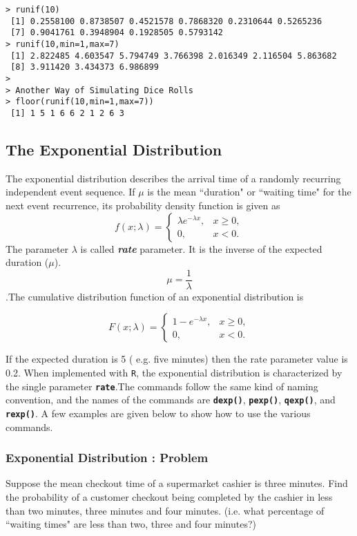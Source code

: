 \begin{verbatim}
> runif(10)
 [1] 0.2558100 0.8738507 0.4521578 0.7868320 0.2310644 0.5265236
 [7] 0.9041761 0.3948904 0.1928505 0.5793142
> runif(10,min=1,max=7)
 [1] 2.822485 4.603547 5.794749 3.766398 2.016349 2.116504 5.863682
 [8] 3.911420 3.434373 6.986899
>
> Another Way of Simulating Dice Rolls
> floor(runif(10,min=1,max=7))
 [1] 1 5 1 6 6 2 1 2 6 3
\end{verbatim}

\newpage
\subsection{The Exponential Distribution}

The exponential distribution describes the arrival time of a randomly recurring independent event sequence. If $\mu$ is the mean ``duration" or ``waiting time" for the next event recurrence, its probability density function is given as
\[
f(x;\lambda) = \begin{cases}
\lambda e^{-\lambda x}, & x \ge 0, \\
0, & x < 0.
\end{cases}\]
The parameter $\lambda$  is called \textbf{\emph{rate}} parameter. It is the inverse of the expected duration ($\mu$).\\
\[\mu= \frac{1}{\lambda}\].The cumulative distribution function of an exponential distribution is

\[
F(x;\lambda) = \begin{cases}
1-e^{-\lambda x}, & x \ge 0, \\
0, & x < 0.
\end{cases}\]

If the expected duration is 5 ( e.g. five minutes) then the rate parameter value is 0.2. When implemented with \texttt{R}, the exponential distribution is characterized by the single parameter \texttt{\textbf{rate}}.The commands follow the same kind of naming convention, and the names of the commands are \texttt{\textbf{dexp()}}, \texttt{\textbf{pexp()}}, \texttt{\textbf{qexp()}}, and \texttt{\textbf{rexp()}}. A few examples are given below to show how to use the various commands. 

\subsubsection{Exponential Distribution : Problem}
Suppose the mean checkout time of a supermarket cashier is three minutes. Find the probability of a customer checkout being completed by the cashier in less than two minutes, three minutes and four minutes. 
(i.e. what percentage of ``waiting times" are less than two, three and four minutes?)

